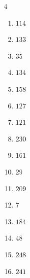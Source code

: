 \begin{multicols}{4}
\begin{enumerate}
  \item $114$


  \item $133$


  \item $35$


  \item $134$


  \item $158$


\columnbreak %

  \item $127$


  \item $121$


  \item $230$


  \item $161$


  \item $29$


  \item $209$


  \item $7$


  \item $184$


  \item $48$


  \item $248$


  \item $241$


\end{enumerate}
\end{multicols}
